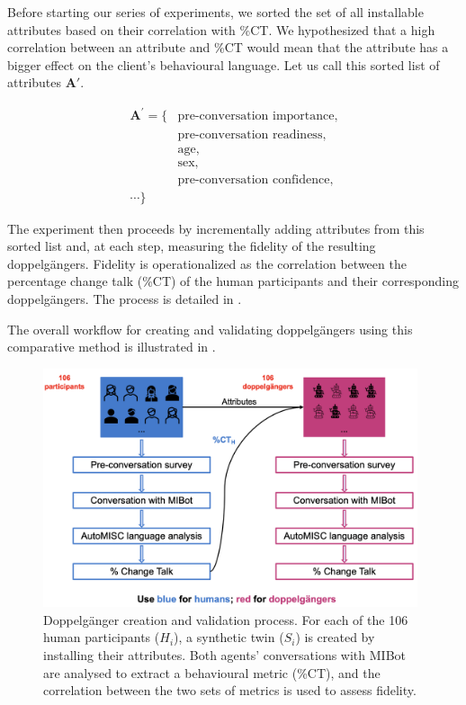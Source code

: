 Before starting our series of experiments, we sorted the set of all installable attributes based on their correlation with \%CT. We hypothesized that a high correlation between an attribute and \%CT would mean that the attribute has a bigger effect on the client's behavioural language. Let us call this sorted list of attributes $\mathbf{A'}$.

$$
	\begin{aligned}
		{\textbf{A}}^{'} = \{ & \text{pre-conversation importance,} \\
		                      & \text{pre-conversation readiness,}  \\
		                      & \text{age,}                         \\
		                      & \text{sex,}                         \\
		                      & \text{pre-conversation confidence,} \\
		\cdots \}
	\end{aligned}
$$

The experiment then proceeds by incrementally adding attributes from this sorted list and, at each step, measuring the fidelity of the resulting doppelgängers. Fidelity is operationalized as the correlation between the percentage change talk (\%CT) of the human participants and their corresponding doppelgängers. The process is detailed in .


The overall workflow for creating and validating doppelgängers using this comparative method is illustrated in .

\begin{figure}[htpb]
	\centering
	\includegraphics[width=0.98\textwidth]{fig/doppelganger-study.png}
	\caption[Doppelgänger creation and validation process]{Doppelgänger creation and validation process. For each of the 106 human participants ($H_i$), a synthetic twin ($S_i$) is created by installing their attributes. Both agents' conversations with MIBot are analysed to extract a behavioural metric (\%CT), and the correlation between the two sets of metrics is used to assess fidelity.}
	\label{fig:doppelgänger-study}
\end{figure}

